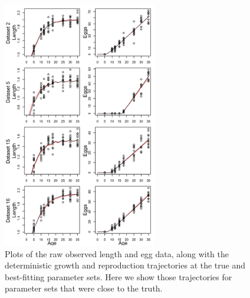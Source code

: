 \documentclass[12pt,reqno,final,pdftex]{amsart}\usepackage[]{graphicx}\usepackage[]{color}
\newenvironment{knitrout}{}{} %
\theoremstyle{plain}
\numberwithin{equation}{part}
\begin{document}
\begin{knitrout}\scriptsize
{}\color{fgcolor}\begin{figure}

\includegraphics[width=0.6\textwidth]{figure/unnamed-chunk-4-1} \hfill{}

\caption[Plots of the raw observed length and egg data, along with the deterministic growth and reproduction trajectories at the true and best-fitting parameter sets]{Plots of the raw observed length and egg data, along with the deterministic growth and reproduction trajectories at the true and best-fitting parameter sets. Here we show those trajectories for parameter sets that were close to the truth.}\label{fig:unnamed-chunk-4}
\end{figure}


\end{knitrout}
\end{document}
